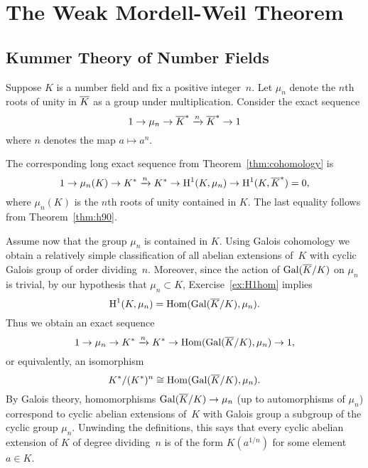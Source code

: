 \chapter{The Weak Mordell-Weil Theorem}\label{ch:weakmw}

\section{Kummer Theory of Number Fields}\label{sec:kummernf}

Suppose $K$ is a number field and fix a positive integer~$n$.
Let $\mu_n$ denote the $n$th roots of unity in $\overline{K}$ as a group
under multiplication. Consider the exact sequence
$$
	1 \to \mu_n \to \overline{K}^* \xrightarrow{n} \overline{K}^* \to 1
$$
where $n$ denotes the map $a\mapsto a^n$.

The corresponding long exact sequence from Theorem~\ref{thm:cohomology}
is
$$
	1 \to \mu_n(K) \to K^* \xrightarrow{n} K^*
	\to \operatorname{H}^1(K,\mu_n) \to \operatorname{H}^1(K,\overline{K}^*) =0,
$$
where $\mu_n(K)$ is the $n$th roots of unity contained in $K$.
The last equality follows from Theorem~\ref{thm:h90}.

Assume now that the group $\mu_n$ is contained in $K$.
Using Galois cohomology we obtain a relatively simple classification
of all abelian extensions of~$K$ with cyclic Galois group of order
dividing~$n$. Moreover, since the action of $\operatorname{Gal}(\overline{K}/K)$ on
$\mu_n$ is trivial, by our hypothesis that $\mu_n\subset K$,
Exercise~\ref{ex:H1hom} implies
$$
	\operatorname{H}^1(K,\mu_n) = \operatorname{Hom}(\operatorname{Gal}(\overline{K}/K),\mu_n).
$$
Thus we obtain an exact sequence
$$
	1 \to \mu_n \to K^* \xrightarrow{n} K^* \to \operatorname{Hom}(\operatorname{Gal}(\overline{K}/K),\mu_n) \to 1,
$$
or equivalently, an isomorphism
$$
	K^*/(K^*)^n \cong \operatorname{Hom}(\operatorname{Gal}(\overline{K}/K),\mu_n).
$$
By Galois theory, homomorphisms $\operatorname{Gal}(\overline{K}/K)\to \mu_n$ (up to
automorphisms of $\mu_n$) correspond to cyclic abelian extensions
of~$K$ with Galois group a subgroup of the cyclic group $\mu_n$.
Unwinding the definitions, this says that every
cyclic abelian extension of $K$ of degree dividing~$n$ is of the form
$K(a^{1/n})$ for some element $a\in K$.

